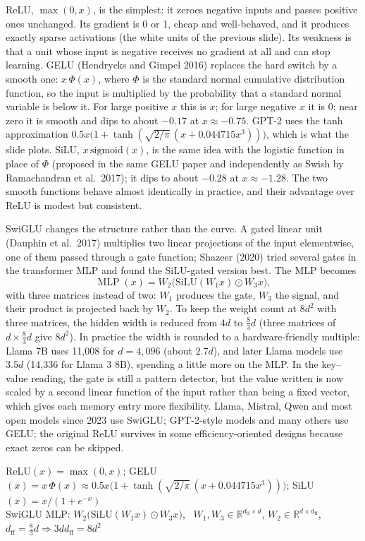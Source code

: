 \documentclass[11pt,letterpaper]{article}
\newenvironment{formulas}{\begin{tcolorbox}[formulabox]}{\end{tcolorbox}}
\newcommand{\dff}{d_{\mathrm{ff}}}
\DeclareMathOperator{\MLP}{MLP}
\begin{document}
ReLU, $\max(0,x)$, is the simplest: it zeroes negative inputs and passes positive ones unchanged. Its gradient is 0 or 1, cheap and well-behaved, and it produces exactly sparse activations (the white units of the previous slide). Its weakness is that a unit whose input is negative receives no gradient at all and can stop learning. GELU (Hendrycks and Gimpel 2016) replaces the hard switch by a smooth one: $x\,\Phi(x)$, where $\Phi$ is the standard normal cumulative distribution function, so the input is multiplied by the probability that a standard normal variable is below it. For large positive $x$ this is $x$; for large negative $x$ it is 0; near zero it is smooth and dips to about $-0.17$ at $x\approx-0.75$. GPT-2 uses the tanh approximation $0.5x\big(1+\tanh(\sqrt{2/\pi}\,(x+0.044715x^3))\big)$, which is what the slide plots. SiLU, $x\,\mathrm{sigmoid}(x)$, is the same idea with the logistic function in place of $\Phi$ (proposed in the same GELU paper and independently as Swish by Ramachandran et al.\ 2017); it dips to about $-0.28$ at $x\approx-1.28$. The two smooth functions behave almost identically in practice, and their advantage over ReLU is modest but consistent.

SwiGLU changes the structure rather than the curve. A gated linear unit (Dauphin et al.\ 2017) multiplies two linear projections of the input elementwise, one of them passed through a gate function; Shazeer (2020) tried several gates in the transformer MLP and found the SiLU-gated version best. The MLP becomes
\[
\MLP(x)=W_2\big(\mathrm{SiLU}(W_1x)\odot W_3x\big),
\]
with three matrices instead of two: $W_1$ produces the gate, $W_3$ the signal, and their product is projected back by $W_2$. To keep the weight count at $8d^2$ with three matrices, the hidden width is reduced from $4d$ to $\tfrac83d$ (three matrices of $d\times\tfrac83d$ give $8d^2$). In practice the width is rounded to a hardware-friendly multiple: Llama 7B uses 11,008 for $d=4{,}096$ (about $2.7d$), and later Llama models use $3.5d$ (14,336 for Llama 3 8B), spending a little more on the MLP. In the key--value reading, the gate is still a pattern detector, but the value written is now scaled by a second linear function of the input rather than being a fixed vector, which gives each memory entry more flexibility. Llama, Mistral, Qwen and most open models since 2023 use SwiGLU; GPT-2-style models and many others use GELU; the original ReLU survives in some efficiency-oriented designs because exact zeros can be skipped.

\begin{formulas}
ReLU$(x)=\max(0,x)$; \quad GELU$(x)=x\,\Phi(x)\approx0.5x\big(1+\tanh(\sqrt{2/\pi}\,(x+0.044715x^3))\big)$; \quad SiLU$(x)=x/(1+e^{-x})$\\[3pt]
SwiGLU MLP: $W_2\big(\mathrm{SiLU}(W_1x)\odot W_3x\big)$, \ $W_1,W_3\in\mathbb{R}^{\dff\times d}$, $W_2\in\mathbb{R}^{d\times\dff}$, \ $\dff=\tfrac83d\Rightarrow3d\dff=8d^2$
\end{formulas}
\end{document}
